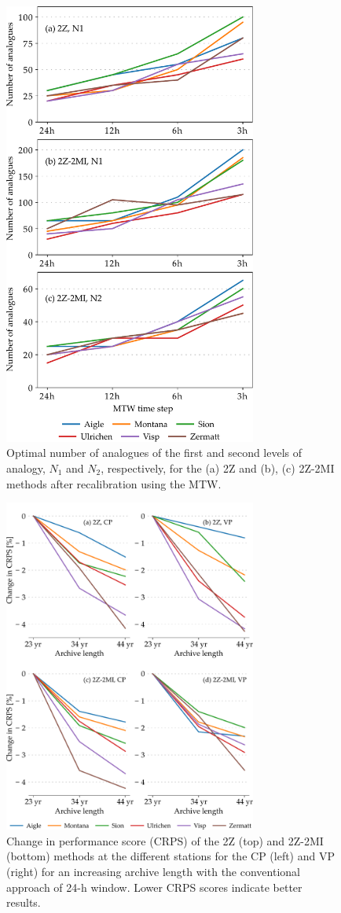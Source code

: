 \documentclass[hess, manuscript]{copernicus}
\begin{document}
	\begin{figure}[htb]
		\includegraphics[width=8.3cm]{fig13.pdf}
		\caption{Optimal number of analogues of the first and second levels of analogy, $N_{1}$ and $N_{2}$, respectively, for the (a) 2Z and (b), (c) 2Z-2MI methods after recalibration using the MTW.}
		\label{fig:analog_nb}
	\end{figure}

	\begin{figure}[htb]
		\includegraphics[width=8.3cm]{fig14.pdf}
		\caption{Change in performance score (CRPS) of the 2Z (top)  and 2Z-2MI (bottom) methods at the different stations for the CP (left) and VP (right) for an increasing archive length with the conventional approach of 24-h window. Lower CRPS scores indicate better results.}
		\label{fig:plots_archive_length}
	\end{figure}
\end{document}
